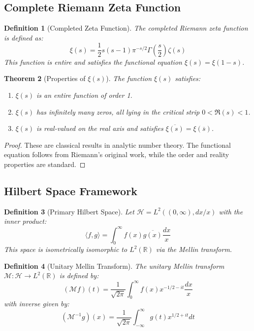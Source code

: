 \documentclass[11pt]{article}
\theoremstyle{plain}
\newtheorem{theorem}{Theorem}[section]
\newtheorem{definition}[theorem]{Definition}
\theoremstyle{remark}
\newcommand{\R}{\mathbb{R}}
\newcommand{\cH}{\mathcal{H}}
\newcommand{\Mellin}{\mathcal{M}}
\begin{document}
\subsection{Complete Riemann Zeta Function}

\begin{definition}[Completed Zeta Function]
The completed Riemann zeta function is defined as:
\[
\xi(s) = \frac{1}{2}s(s-1)\pi^{-s/2}\Gamma\left(\frac{s}{2}\right)\zeta(s)
\]
This function is entire and satisfies the functional equation $\xi(s) = \xi(1-s)$.
\end{definition}

\begin{theorem}[Properties of $\xi(s)$]
The function $\xi(s)$ satisfies:
\begin{enumerate}
\item $\xi(s)$ is an entire function of order 1.
\item $\xi(s)$ has infinitely many zeros, all lying in the critical strip $0 < \Re(s) < 1$.
\item $\xi(s)$ is real-valued on the real axis and satisfies $\overline{\xi(s)} = \xi(\overline{s})$.
\end{enumerate}
\end{theorem}

\begin{proof}
These are classical results in analytic number theory. The functional equation follows from Riemann's original work, while the order and reality properties are standard.
\end{proof}

\subsection{Hilbert Space Framework}

\begin{definition}[Primary Hilbert Space]
Let $\cH = L^2((0,\infty), dx/x)$ with the inner product:
\[
\langle f, g \rangle = \int_0^\infty f(x)\overline{g(x)} \frac{dx}{x}
\]
This space is isometrically isomorphic to $L^2(\R)$ via the Mellin transform.
\end{definition}

\begin{definition}[Unitary Mellin Transform]
The unitary Mellin transform $\Mellin: \cH \to L^2(\R)$ is defined by:
\[
(\Mellin f)(t) = \frac{1}{\sqrt{2\pi}} \int_0^\infty f(x) x^{-1/2 - it} \frac{dx}{x}
\]
with inverse given by:
\[
(\Mellin^{-1} g)(x) = \frac{1}{\sqrt{2\pi}} \int_{-\infty}^\infty g(t) x^{1/2 + it} dt
\]
\end{definition}
\end{document}
